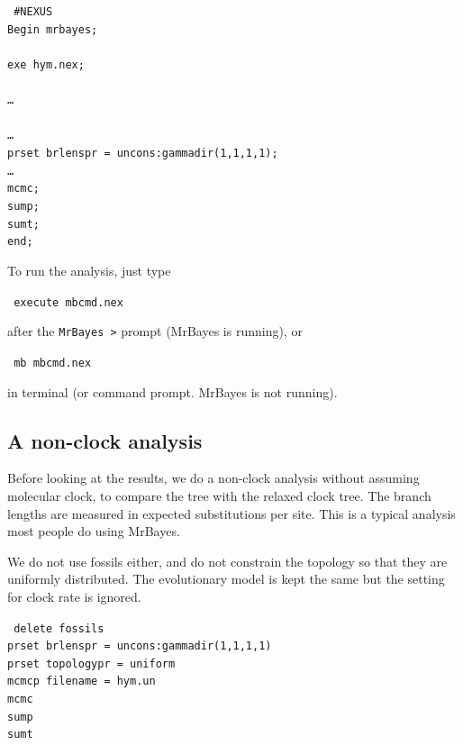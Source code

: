 \documentclass[12pt]{article}
\begin{document}
\medskip
{\tt \noindent
\#NEXUS        \\
Begin mrbayes; \\
 \\
\indent exe hym.nex; \\
 \\
\indent \dots  \\
 \\
\indent \dots  \\
\indent prset brlenspr = uncons:gammadir(1,1,1,1); \\
\indent \dots  \\
\indent mcmc;  \\
\indent sump;  \\
\indent sumt;  \\
end;
}
\medskip

\noindent To run the analysis, just type

\medskip
{\tt \noindent \color{red} execute mbcmd.nex}
\medskip

\noindent after the {\tt MrBayes >} prompt (MrBayes is running), or

\medskip
{\tt \noindent \color{blue} mb mbcmd.nex}
\medskip

\noindent in terminal (or command prompt. MrBayes is not running).

\subsection{A non-clock analysis}

Before looking at the results, we do a non-clock analysis without assuming molecular clock, to compare the tree with the relaxed clock tree.
The branch lengths are measured in expected substitutions per site.
This is a typical analysis most people do using MrBayes.

We do not use fossils either, and do not constrain the topology so that they are uniformly distributed.
The evolutionary model is kept the same but the setting for clock rate is ignored. 

\medskip
{\tt \color{red} \noindent
delete fossils  \\
prset brlenspr = uncons:gammadir(1,1,1,1) \\
prset topologypr = uniform  \\
mcmcp filename = hym.un \\
mcmc  \\
sump  \\
sumt
}
\medskip
\end{document}
